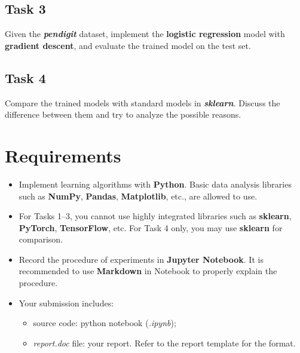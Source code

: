 \documentclass[12pt,a4paper]{article}
\begin{document}
\subsection{Task 3}

Given the \textbf{\textit{pendigit}} dataset, implement the
\textbf{logistic regression} model with \textbf{gradient descent}, and evaluate the
trained model on the test set.

\subsection{Task 4}

Compare the trained models with standard models in \textbf{\textit{sklearn}}.
Discuss the difference between them and try to analyze the possible reasons.

\section{Requirements}

\begin{itemize}
  \item Implement learning algorithms with \textbf{Python}. Basic data analysis
        libraries such as \textbf{NumPy}, \textbf{Pandas}, \textbf{Matplotlib},
        etc., are allowed to use.

  \item For Tasks 1--3, you cannot use highly integrated libraries such as
        \textbf{sklearn}, \textbf{PyTorch}, \textbf{TensorFlow}, etc. For Task 4
        only, you may use \textbf{sklearn} for comparison.

  \item Record the procedure of experiments in \textbf{Jupyter Notebook}. It is
        recommended to use \textbf{Markdown} in Notebook to properly explain the
        procedure.

  \item Your submission includes:
        \begin{itemize}
          \item source code: python notebook (\textit{.ipynb});
          \item \textit{report.doc} file: your report. Refer to the report template
                for the format.
        \end{itemize}
\end{itemize}
\end{document}
